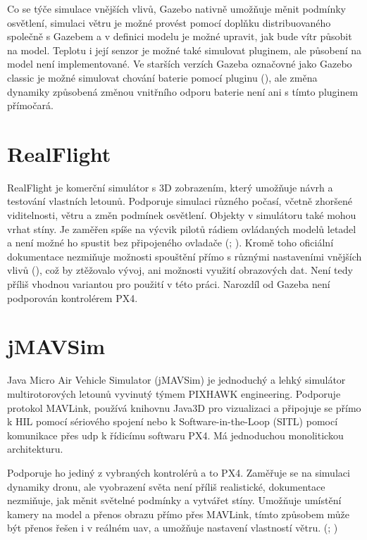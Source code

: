         Co se týče simulace vnějších vlivů, Gazebo nativně umožňuje měnit podmínky osvětlení, simulaci větru je možné provést pomocí doplňku distribuovaného společně s Gazebem a v definici modelu je možné upravit, jak bude vítr působit na model. Teplotu i její senzor je možné také simulovat pluginem, ale působení na model není implementované. Ve starších verzích Gazeba označovné jako Gazebo classic je možné simulovat chování baterie pomocí pluginu (\cite{batplugin}), ale změna dynamiky způsobená změnou vnitřního odporu baterie není ani s tímto pluginem přímočará.

    \section{RealFlight} \label{sec:realflight}
        RealFlight je komerční simulátor s 3D zobrazením, který umožňuje návrh a testování vlastních letounů. Podporuje simulaci různého počasí, včetně zhoršené viditelnosti, větru a změn podmínek osvětlení. Objekty v simulátoru také mohou vrhat stíny. Je zaměřen spíše na výcvik pilotů rádiem ovládaných modelů letadel a není možné ho spustit bez připojeného ovladače (\cite{ardupilot:realflight}; \cite{realflight}). Kromě toho oficiální dokumentace nezmiňuje možnosti spouštění přímo s různými nastaveními vnějších vlivů (\cite{realflight}), což by ztěžovalo vývoj, ani možnosti využití obrazových dat. Není tedy příliš vhodnou variantou pro použití v této práci. Narozdíl od Gazeba není podporován kontrolérem PX4.

    \section{jMAVSim} \label{sec:jmavsim}
        Java Micro Air Vehicle Simulator (jMAVSim) je jednoduchý a lehký simulátor multirotorových letounů vyvinutý týmem PIXHAWK engineering. Podporuje protokol MAVLink, používá knihovnu Java3D pro vizualizaci a připojuje se přímo k HIL pomocí sériového spojení nebo k Software-in-the-Loop (SITL) pomocí komunikace přes \acrfull{udp} k řídicímu softwaru PX4. Má jednoduchou monolitickou architekturu. \cite{Ebeid2018}

        Podporuje ho jediný z vybraných kontrolérů a to PX4. Zaměřuje se na simulaci dynamiky dronu, ale vyobrazení světa není příliš realistické, dokumentace nezmiňuje, jak měnit světelné podmínky a vytvářet stíny. Umožňuje umístění kamery na model a přenos obrazu přímo přes MAVLink, tímto způsobem může být přenos řešen i v reálném \acrshort{uav}, a umožňuje nastavení vlastností větru. (\cite{jmavsim}; \cite{px4:jmavsim})

